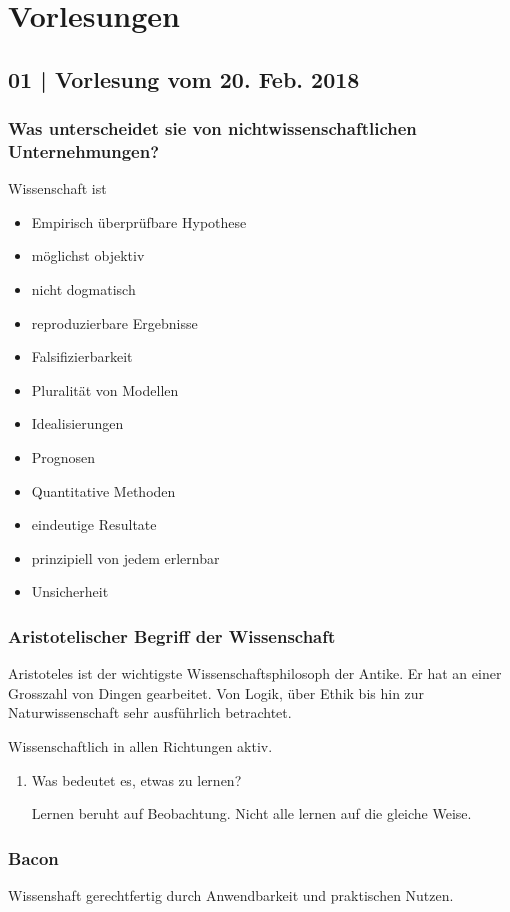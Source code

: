 \documentclass[11pt]{article}
\begin{document}
\section{Vorlesungen}
\label{sec-3}

\subsection{01 | Vorlesung vom 20. Feb. 2018}
\label{sec-3-1}

\subsubsection{Was unterscheidet sie von nichtwissenschaftlichen Unternehmungen?}
\label{sec-3-1-1}

Wissenschaft ist

\begin{itemize}
\item Empirisch überprüfbare Hypothese
\item möglichst objektiv
\item nicht dogmatisch
\item reproduzierbare Ergebnisse
\item Falsifizierbarkeit
\item Pluralität von Modellen
\item Idealisierungen
\item Prognosen
\item Quantitative Methoden
\item eindeutige Resultate
\item prinzipiell von jedem erlernbar
\item Unsicherheit
\end{itemize}

\subsubsection{Aristotelischer Begriff der Wissenschaft}
\label{sec-3-1-2}

Aristoteles ist der wichtigste Wissenschaftsphilosoph der Antike. Er hat an
einer Grosszahl von Dingen gearbeitet. Von Logik, über Ethik bis hin zur
Naturwissenschaft sehr ausführlich betrachtet.

Wissenschaftlich in allen Richtungen aktiv.

\begin{enumerate}
\item Was bedeutet es, etwas zu lernen?
\label{sec-3-1-2-1}

Lernen beruht auf Beobachtung. Nicht alle lernen auf die gleiche Weise.
\end{enumerate}

\subsubsection{Bacon}
\label{sec-3-1-3}

Wissenshaft gerechtfertig durch Anwendbarkeit und praktischen Nutzen.
\end{document}
